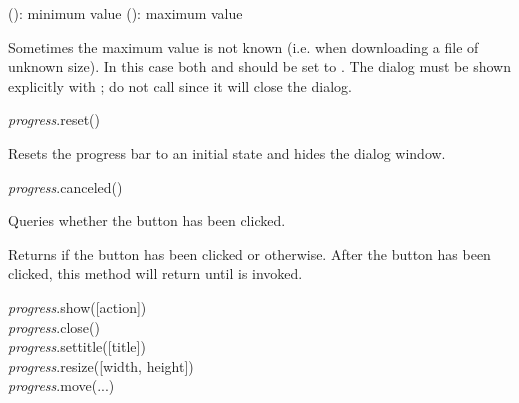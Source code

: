 \documentclass[a4paper,12pt,twoside,extrafontsizes]{memoir}
\begin{document}
\begin{funcparams}
	 (): minimum value
	 (): maximum value
\end{funcparams}

\begin{funcremarks}
	Sometimes the maximum value is not known (i.e. when downloading a file of unknown size). In this case both  and  should be set to . The dialog must be shown explicitly with ; do not call  since it will close the dialog.
\end{funcremarks}


\begin{luafuncprototype}
\emph{progress}.reset()
\end{luafuncprototype}

\begin{funcdescr}
	Resets the progress bar to an initial state and hides the dialog window.
\end{funcdescr}


\begin{luafuncprototype}
\emph{progress}.canceled()
\end{luafuncprototype}

\begin{funcdescr}
	Queries whether the  button has been clicked.
\end{funcdescr}

\begin{funcret}
	Returns  if the  button has been clicked or  otherwise. After the  button has been clicked, this method will return  until  is invoked.
\end{funcret}


\begin{luafuncprototype}
\emph{progress}.show([action]) \\
\emph{progress}.close() \\
\emph{progress}.settitle([title]) \\
\emph{progress}.resize([width, height]) \\
\emph{progress}.move(...)
\end{luafuncprototype}
\end{document}
